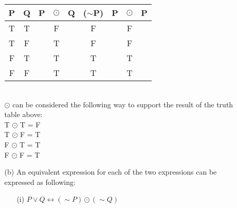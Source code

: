 \documentclass[12pt,a4paper]{article}
\theoremstyle{plain}
\theoremstyle{definition}
\begin{document}
\begin{itemize}
\begin{enumerate}
        \begin{tabular}{|c|c|lcl|c|lcl|}
            \multicolumn{1}{|l|}{P} & \multicolumn{1}{l|}{Q} & P & \multicolumn{1}{l}{$\odot$} & Q & \multicolumn{1}{l|}{($\sim$P)} & P & \multicolumn{1}{l}{$\odot$} & P \\ \hline
            T                       & T                      &   & F                        &   & F                          &   & F                        &   \\
            T                       & F                      &   & T                        &   & F                          &   & F                        &   \\
            F                       & T                      &   & T                        &   & T                          &   & T                        &   \\
            F                       & F                      &   & T                        &   & T                          &   & T                        &  
        \end{tabular} \\
    
    $\odot$ can be considered the following way to support the result of the truth table above:\\
        T $\odot$ T = F \\
        T $\odot$ F = T \\
        F $\odot$ T = T \\
        F $\odot$ F = T

    \item[(b)]
    An equivalent expression for each of the two expressions can be expressed as following:

    \begin{itemize}
        \item[(i)]
        $P \lor Q \leftrightarrow (\sim P)\odot (\sim Q)$ \\
    \end{itemize} 


\end{enumerate}
\end{itemize}
\end{document}
